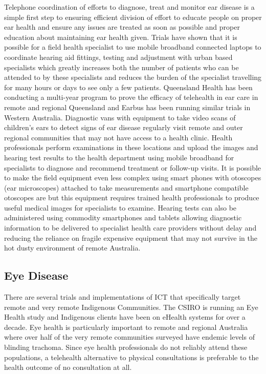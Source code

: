 Telephone coordination of efforts to diagnose, treat and monitor ear disease is a simple first step to ensuring efficient division of effort to educate people on proper ear health and ensure any issues are treated as soon as possible and proper education about maintaining ear health given\cite{hill2008tackling}. Trials have shown that it is possible for a field health specialist to use mobile broadband connected laptops to coordinate hearing aid fittings, testing and adjustment with urban based specialists which greatly increases both the number of patients who can be attended to by these specialists and reduces the burden of the specialist travelling for many hours or days to see only a few patients\cite{pearce2009pilot}. Queensland Health has been conducting a multi-year program to prove the efficacy of telehealth in ear care in remote and regional Queensland\cite{elliott2010feasibility} and Earbus has been running similar trials in Western Australia\cite[p10]{brook2013analysing}. Diagnostic vans with equipment to take video scans of children's ears to detect signs of ear disease regularly visit remote and outer regional communities that may not have access to a health clinic. Health professionals perform examinations in these locations and upload the images and hearing test results to the health department using mobile broadband for specialists to diagnose and recommend treatment or follow-up visits\cite{SmithAnthonyC2012Amte}. It is possible to make the field equipment even less complex using smart phones with otoscopes (ear microscopes) attached to take measurements and smartphone compatible otoscopes are but this equipment requires trained health professionals to produce useful medical images for specialists to examine\cite{ShahMananUdayan2018ioCa}. Hearing tests can also be administered using commodity  smartphones and tablets allowing diagnostic information to be delivered to specialist health care providers without delay\cite{brook2013developing} and reducing the reliance on fragile expensive equipment that may not survive in the hot dusty environment of remote Australia.

\subsection{Eye Disease}

There are several trials and implementations of ICT that specifically target remote and very remote Indigenous Communities. The CSIRO is running an Eye Health study and Indigenous clients have been on eHealth systems for over a decade\cite{RefWorks:209}. Eye health is particularly important to remote and regional Australia where over half of the very remote communities surveyed have endemic levels of blinding trachoma\cite{RefWorks:210}. Since eye health professionals do not reliably attend these populations, a telehealth alternative to physical consultations is preferable to the health outcome of no consultation at all\cite{RefWorks:211}.

